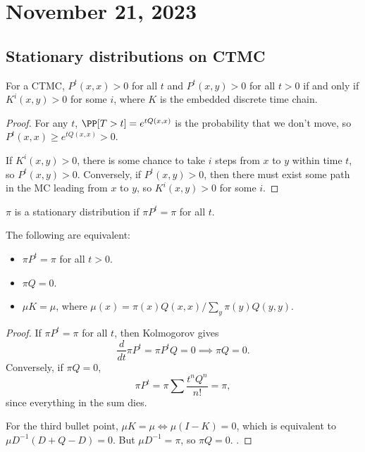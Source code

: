\section{November 21, 2023}

\subsection{Stationary distributions on CTMC}

\begin{theorem}
\proplabel

For a CTMC, $P^t(x,x) > 0$ for all $t$ and $P^t(x,y) > 0$ for all $t > 0$ if and only if $K^i(x,y) > 0$ for some $i$, where $K$ is the embedded discrete time chain. 
\end{theorem}

\begin{proof}
For any $t$, $\PP[T > t] = e^{tQ(x,x)}$ is the probability that we don't move, so $P^t(x,x)\geq e^{tQ(x,x)} > 0$. 

If $K^i(x,y) > 0$, there is some chance to take $i$ steps from $x$ to $y$ within time $t$, so $P^t(x,y) > 0$. Conversely, if $P^t(x,y) > 0$, then there must exist some path in the MC leading from $x$ to $y$, so $K^i(x,y)>0$ for some $i$. 
\end{proof}

\begin{definition}

$\pi$ is a stationary distribution if $\pi P^t = \pi$ for all $t$. 
\end{definition}

\begin{theorem}
\proplabel

The following are equivalent: 

\begin{itemize}
	\item $\pi P^t = \pi$ for all $t > 0$. 
	\item $\pi Q = 0$.
	\item $\mu K = \mu$, where $\mu(x) = \pi(x) Q(x,x) / \sum_y \pi(y) Q(y,y)$. 
\end{itemize}
\end{theorem}

\begin{proof}
If $\pi P^t = \pi$ for all $t$, then Kolmogorov gives 
\[\frac{d}{dt} \pi P^t = \pi P^t Q = 0\implies \pi Q = 0.\]
Conversely, if $\pi Q = 0$, 
\[\pi P^t = \pi \sum \frac{t^nQ^n}{n!} = \pi,\] 
since everything in the sum dies. 

For the third bullet point, $\mu K = \mu \iff \mu (I - K) = 0$, which is equivalent to $\mu D^{-1}(D + Q - D) = 0$. But $\mu D^{-1} = \pi$, so $\pi Q = 0$. .  
\end{proof}

